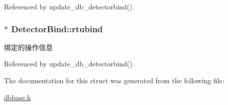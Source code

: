 Referenced by update\-\_\-db\-\_\-detectorbind().

\hypertarget{structDetectorBind_a051da44e061843becfc64dd40e8a2d75}{
\subsubsection[{rtubind}]{$\ast$ Detector\-Bind\-::rtubind}}\label{structDetectorBind_a051da44e061843becfc64dd40e8a2d75}


绑定的操作信息 



Referenced by update\-\_\-db\-\_\-detectorbind().



The documentation for this struct was generated from the following file\-:\begin{DoxyCompactItemize}
\item 
\hyperlink{dbbase_8h}{dbbase.\-h}\end{DoxyCompactItemize}
